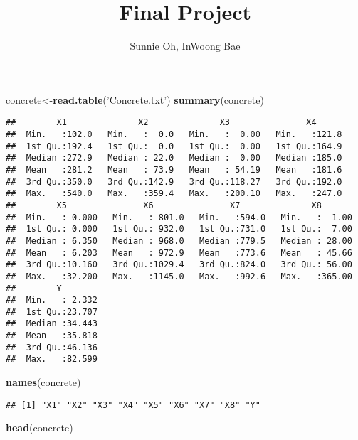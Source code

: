 \documentclass[]{article}
\title{Final Project}
\author{Sunnie Oh, InWoong Bae}
\date{}
\newenvironment{Shaded}{\begin{snugshade}}{\end{snugshade}}
\newcommand{\KeywordTok}[1]{\textcolor[rgb]{0.13,0.29,0.53}{\textbf{#1}}}
\newcommand{\StringTok}[1]{\textcolor[rgb]{0.31,0.60,0.02}{#1}}
\newcommand{\NormalTok}[1]{#1}
\begin{document}
\maketitle

\begin{Shaded}
\begin{Highlighting}[]
\NormalTok{concrete<-}\KeywordTok{read.table}\NormalTok{(}\StringTok{'Concrete.txt'}\NormalTok{)}
\KeywordTok{summary}\NormalTok{(concrete)}
\end{Highlighting}
\end{Shaded}

\begin{verbatim}
##        X1              X2              X3               X4       
##  Min.   :102.0   Min.   :  0.0   Min.   :  0.00   Min.   :121.8  
##  1st Qu.:192.4   1st Qu.:  0.0   1st Qu.:  0.00   1st Qu.:164.9  
##  Median :272.9   Median : 22.0   Median :  0.00   Median :185.0  
##  Mean   :281.2   Mean   : 73.9   Mean   : 54.19   Mean   :181.6  
##  3rd Qu.:350.0   3rd Qu.:142.9   3rd Qu.:118.27   3rd Qu.:192.0  
##  Max.   :540.0   Max.   :359.4   Max.   :200.10   Max.   :247.0  
##        X5               X6               X7              X8        
##  Min.   : 0.000   Min.   : 801.0   Min.   :594.0   Min.   :  1.00  
##  1st Qu.: 0.000   1st Qu.: 932.0   1st Qu.:731.0   1st Qu.:  7.00  
##  Median : 6.350   Median : 968.0   Median :779.5   Median : 28.00  
##  Mean   : 6.203   Mean   : 972.9   Mean   :773.6   Mean   : 45.66  
##  3rd Qu.:10.160   3rd Qu.:1029.4   3rd Qu.:824.0   3rd Qu.: 56.00  
##  Max.   :32.200   Max.   :1145.0   Max.   :992.6   Max.   :365.00  
##        Y         
##  Min.   : 2.332  
##  1st Qu.:23.707  
##  Median :34.443  
##  Mean   :35.818  
##  3rd Qu.:46.136  
##  Max.   :82.599
\end{verbatim}

\begin{Shaded}
\begin{Highlighting}[]
\KeywordTok{names}\NormalTok{(concrete)}
\end{Highlighting}
\end{Shaded}

\begin{verbatim}
## [1] "X1" "X2" "X3" "X4" "X5" "X6" "X7" "X8" "Y"
\end{verbatim}

\begin{Shaded}
\begin{Highlighting}[]
\KeywordTok{head}\NormalTok{(concrete)}
\end{Highlighting}
\end{Shaded}
\end{document}
